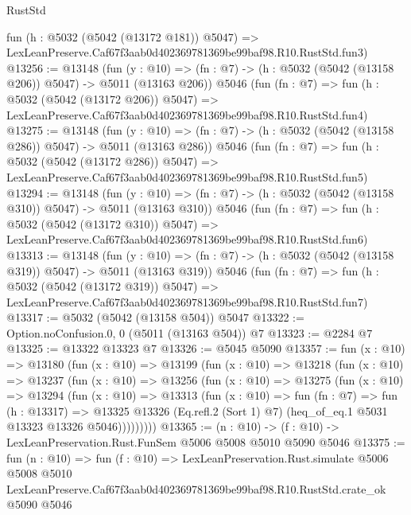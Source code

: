 \begin{lexlean}{RustStd}
\begin{coremodule}
    fun (h : @5032 (@5042 (@13172 @181)) @5047) =>
    LexLeanPreserve.Caf67f3aab0d402369781369be99baf98.R10.RustStd.fun3)
@13256 := @13148
    (fun (y : @10) => (fn : @7) -> (h : @5032 (@5042 (@13158 @206)) @5047) -> @5011 (@13163 @206))
    @5046
    (fun (fn : @7) =>
    fun (h : @5032 (@5042 (@13172 @206)) @5047) =>
    LexLeanPreserve.Caf67f3aab0d402369781369be99baf98.R10.RustStd.fun4)
@13275 := @13148
    (fun (y : @10) => (fn : @7) -> (h : @5032 (@5042 (@13158 @286)) @5047) -> @5011 (@13163 @286))
    @5046
    (fun (fn : @7) =>
    fun (h : @5032 (@5042 (@13172 @286)) @5047) =>
    LexLeanPreserve.Caf67f3aab0d402369781369be99baf98.R10.RustStd.fun5)
@13294 := @13148
    (fun (y : @10) => (fn : @7) -> (h : @5032 (@5042 (@13158 @310)) @5047) -> @5011 (@13163 @310))
    @5046
    (fun (fn : @7) =>
    fun (h : @5032 (@5042 (@13172 @310)) @5047) =>
    LexLeanPreserve.Caf67f3aab0d402369781369be99baf98.R10.RustStd.fun6)
@13313 := @13148
    (fun (y : @10) => (fn : @7) -> (h : @5032 (@5042 (@13158 @319)) @5047) -> @5011 (@13163 @319))
    @5046
    (fun (fn : @7) =>
    fun (h : @5032 (@5042 (@13172 @319)) @5047) =>
    LexLeanPreserve.Caf67f3aab0d402369781369be99baf98.R10.RustStd.fun7)
@13317 := @5032 (@5042 (@13158 @504)) @5047
@13322 := Option.noConfusion.{0, 0} (@5011 (@13163 @504)) @7
@13323 := @2284 @7
@13325 := @13322 @13323 @7
@13326 := @5045 @5090
@13357 := fun (x : @10) =>
  @13180
    (fun (x : @10) =>
    @13199
      (fun (x : @10) =>
      @13218
        (fun (x : @10) =>
        @13237
          (fun (x : @10) =>
          @13256
            (fun (x : @10) =>
            @13275
              (fun (x : @10) =>
              @13294
                (fun (x : @10) =>
                @13313
                  (fun (x : @10) =>
                  fun (fn : @7) =>
                  fun (h : @13317) =>
                  @13325
                    @13326
                    (Eq.refl.{2} (Sort 1) @7)
                    (heq_of_eq.{1} @5031 @13323 @13326 @5046)))))))))
@13365 := (n : @10) -> (f : @10) -> LexLeanPreservation.Rust.FunSem @5006 @5008 @5010 @5090 @5046
@13375 := fun (n : @10) =>
  fun (f : @10) =>
  LexLeanPreservation.Rust.simulate
    @5006
    @5008
    @5010
    LexLeanPreserve.Caf67f3aab0d402369781369be99baf98.R10.RustStd.crate_ok
    @5090
    @5046
\end{coremodule}
\end{lexlean}
